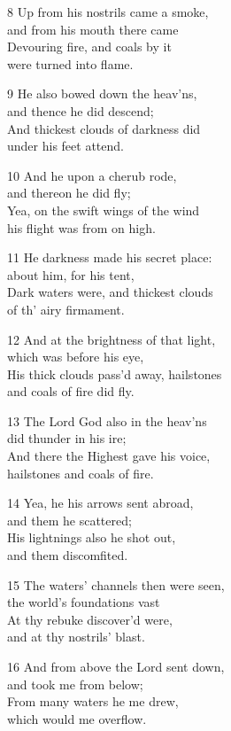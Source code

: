 8 Up from his nostrils came a smoke,\\
and from his mouth there came\\
Devouring fire, and coals by it\\
were turned into flame.

9 He also bowed down the heav’ns,\\
and thence he did descend;\\
And thickest clouds of darkness did\\
under his feet attend.

10 And he upon a cherub rode,\\
and thereon he did fly;\\
Yea, on the swift wings of the wind\\
his flight was from on high.

11 He darkness made his secret place:\\
about him, for his tent,\\
Dark waters were, and thickest clouds\\
of th’ airy firmament.

12 And at the brightness of that light,\\
which was before his eye,\\
His thick clouds pass’d away, hailstones\\
and coals of fire did fly.

13 The Lord God also in the heav’ns\\
did thunder in his ire;\\
And there the Highest gave his voice,\\
hailstones and coals of fire.

14 Yea, he his arrows sent abroad,\\
and them he scattered;\\
His lightnings also he shot out,\\
and them discomfited.

15 The waters’ channels then were seen,\\
the world’s foundations vast\\
At thy rebuke discover’d were,\\
and at thy nostrils’ blast.

16 And from above the Lord sent down,\\
and took me from below;\\
From many waters he me drew,\\
which would me overflow.

